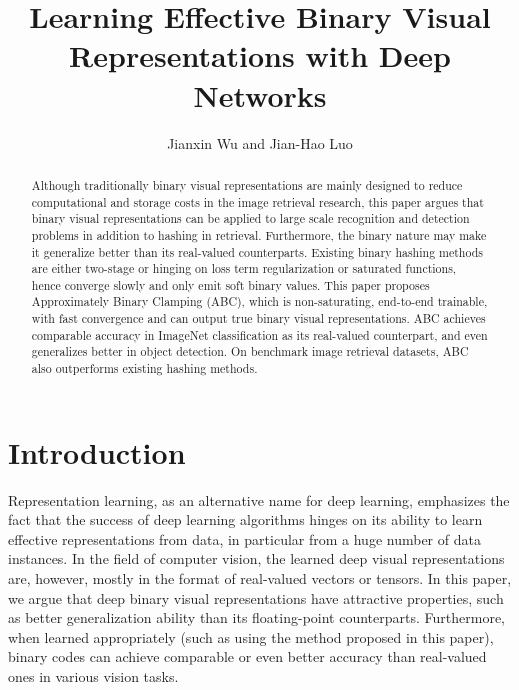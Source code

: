 \documentclass[runningheads]{llncs}
\begin{document}
\pagestyle{headings}
\mainmatter
\def\ECCV18SubNumber{***}  %

\title{Learning Effective Binary Visual Representations with Deep Networks}



\author{Jianxin Wu and Jian-Hao Luo}


\maketitle

\begin{abstract}
Although traditionally binary visual representations are mainly designed to reduce computational and storage costs in the image retrieval research, this paper argues that binary visual representations can be applied to large scale recognition and detection problems in addition to hashing in retrieval. Furthermore, the binary nature may make it generalize better than its real-valued counterparts. Existing binary hashing methods are either two-stage or hinging on loss term regularization or saturated functions, hence converge slowly and only emit soft binary values. This paper proposes Approximately Binary Clamping (ABC), which is non-saturating, end-to-end trainable, with fast convergence and can output true binary visual representations. ABC achieves comparable accuracy in ImageNet classification as its real-valued counterpart, and even generalizes better in object detection. On benchmark image retrieval datasets, ABC also outperforms existing hashing methods.
\end{abstract}


\section{Introduction}

Representation learning, as an alternative name for deep learning, emphasizes the fact that the success of deep learning algorithms hinges on its ability to learn effective representations from data, in particular from a huge number of data instances. In the field of computer vision, the learned deep visual representations are, however, mostly in the format of real-valued vectors or tensors. In this paper, we argue that deep binary visual representations have attractive properties, such as better generalization ability than its floating-point counterparts. Furthermore, when learned appropriately (such as using the method proposed in this paper), binary codes can achieve comparable or even better accuracy than real-valued ones in various vision tasks.
\end{document}
